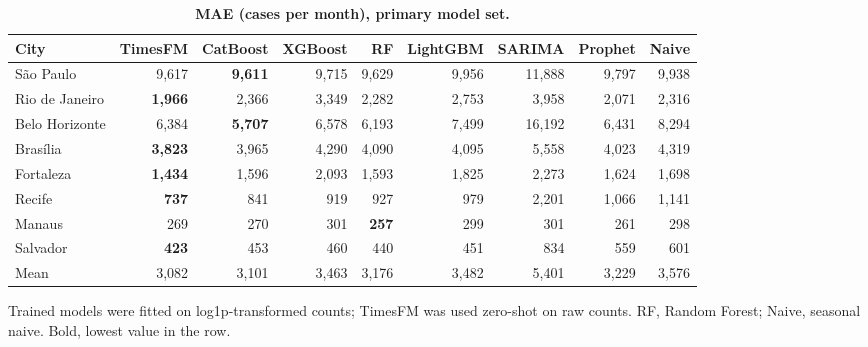 
\begin{table}[!ht]
\centering
\small
\caption{\textbf{MAE (cases per month), primary model set.}}
\begin{tabular}{lrrrrrrrr}
\toprule
City & TimesFM & CatBoost & XGBoost & RF & LightGBM & SARIMA & Prophet & Naive \\
\midrule
S\~ao Paulo & 9{,}617 & \textbf{9{,}611} & 9{,}715 & 9{,}629 & 9{,}956 & 11{,}888 & 9{,}797 & 9{,}938 \\
Rio de Janeiro & \textbf{1{,}966} & 2{,}366 & 3{,}349 & 2{,}282 & 2{,}753 & 3{,}958 & 2{,}071 & 2{,}316 \\
Belo Horizonte & 6{,}384 & \textbf{5{,}707} & 6{,}578 & 6{,}193 & 7{,}499 & 16{,}192 & 6{,}431 & 8{,}294 \\
Bras\'ilia & \textbf{3{,}823} & 3{,}965 & 4{,}290 & 4{,}090 & 4{,}095 & 5{,}558 & 4{,}023 & 4{,}319 \\
Fortaleza & \textbf{1{,}434} & 1{,}596 & 2{,}093 & 1{,}593 & 1{,}825 & 2{,}273 & 1{,}624 & 1{,}698 \\
Recife & \textbf{737} & 841 & 919 & 927 & 979 & 2{,}201 & 1{,}066 & 1{,}141 \\
Manaus & 269 & 270 & 301 & \textbf{257} & 299 & 301 & 261 & 298 \\
Salvador & \textbf{423} & 453 & 460 & 440 & 451 & 834 & 559 & 601 \\
\midrule
Mean & 3{,}082 & 3{,}101 & 3{,}463 & 3{,}176 & 3{,}482 & 5{,}401 & 3{,}229 & 3{,}576 \\
\bottomrule
\end{tabular}
\begin{flushleft} Trained models were fitted on log1p-transformed counts; TimesFM was used zero-shot on raw counts. RF, Random Forest; Naive, seasonal naive. Bold, lowest value in the row.
\end{flushleft}
\label{tabB}
\end{table}
